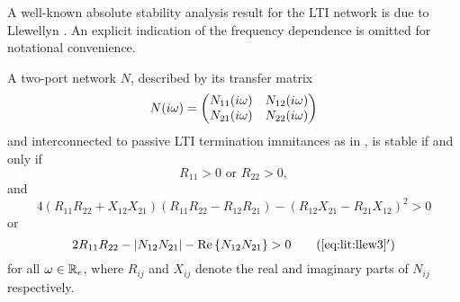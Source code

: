 A well-known absolute stability analysis result for the LTI network is due to Llewellyn \cite{llewellyn}. 
An explicit indication of the frequency dependence is omitted for notational convenience.
\begin{thm}\label{thm:apdx:llw}
A two-port network $N$,  described by its transfer matrix
\[
N(i\omega) = \begin{pmatrix}N_{11}(i\omega) &N_{12}(i\omega)\\N_{21}(i\omega) &N_{22}(i\omega)\end{pmatrix}
\]
and interconnected to passive LTI termination immitances as in , is stable if and only if
\begin{equation}R_{11} > 0\text{ or } R_{22} > 0,\label{eq:lit:llew2}\end{equation} and
\begin{equation}4\left(R_{11}R_{22}+X_{12}X_{21}\right)\left(R_{11}R_{22}-R_{12}R_{21}\right)-\left(R_{12}X_{21}-R_{21}X_{12}\right)^2 > 0\label{eq:lit:llew3}\end{equation} 
or
\begin{equation}2R_{11}R_{22}-\abs{N_{12}N_{21}}-\Re{N_{12}N_{21}} > 0\tag{\ref{eq:lit:llew3}$'$}\label{eq:lit:llew3p}\end{equation}
for all $\omega\in\mathbb{R}_e$, where $R_{ij}$ and $X_{ij}$ denote the real and imaginary parts of $N_{ij}$ respectively.
\end{thm}
